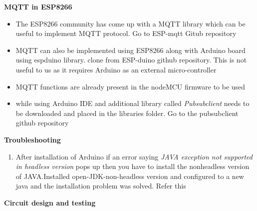 \documentclass[16pt]{article}
\begin{document}
\vspace{0.5cm}

{\Large{\textbf{MQTT in ESP8266}}}

\begin{itemize}

\item
  The ESP8266 community has come up with a MQTT library which can be
  useful to implement MQTT protocol. Go to ESP-mqtt Gitub repository
 
\item
  MQTT can also be implemented using ESP8266 along with Arduino board
  using espduino library. clone from ESP-duino github repository. This is not
  useful to us as it requires Arduino as an external micro-controller
\item
  MQTT functions are already present in the nodeMCU firmware to be used
\item
  while using Arduino IDE and additional library called
  \emph{Pubsubclient} needs to be downloaded and placed in the libraries
  folder. Go to the pubsubclient github repository
\end{itemize}

\vspace{0.5cm}

{\Large{\textbf{Troubleshooting}}}

\begin{enumerate}

\item
  After installation of Arduino if an error saying \emph{JAVA exception
  not supported in headless version} pops up then you have to install
  the nonheadless version of JAVA.Installed open-JDK-non-headless
  version and configured to a new java and the installation problem was
  solved. Refer this
\end{enumerate}


\vspace{3.5cm}

{\LARGE{\textbf{Circuit design and testing}}}
\end{document}
